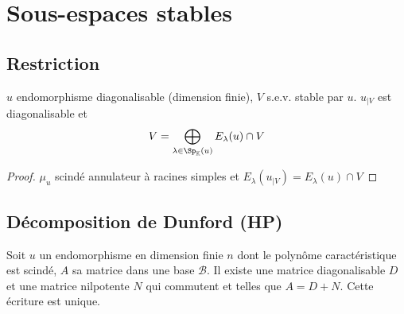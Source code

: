 \section{Sous-espaces stables}

\subsection{Restriction}

\begin{prop}
    \Hyp $u$ endomorphisme diagonalisable (dimension finie), $V$ s.e.v. stable par $u$.
    \Conc $u_{|V}$ est diagonalisable et \[
        V=\bigoplus_{\lambda\in\Sp_{\K}(u)}E_\lambda(u)\cap V
    \]
\end{prop}

\begin{proof}
    $\mu_u$ scindé annulateur à racines simples et $E_\lambda(u_{|V})=E_\lambda(u)\cap V$
\end{proof}

\subsection{Décomposition de Dunford (HP)}


\begin{res}
    Soit $u$ un endomorphisme en dimension finie $n$ dont le polynôme caractéristique est scindé, $A$ sa matrice dans une base $\mathcal B$. Il existe une matrice diagonalisable $D$ et une matrice nilpotente $N$ qui commutent et telles que $A=D+N$. Cette écriture est unique.
\end{res}

